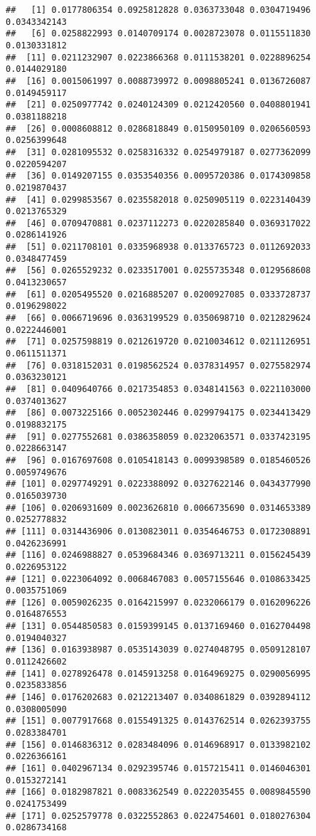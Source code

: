 \documentclass[
]{article}
\begin{document}
\begin{verbatim}
##   [1] 0.0177806354 0.0925812828 0.0363733048 0.0304719496 0.0343342143
##   [6] 0.0258822993 0.0140709174 0.0028723078 0.0115511830 0.0130331812
##  [11] 0.0211232907 0.0223866368 0.0111538201 0.0228896254 0.0144029180
##  [16] 0.0015061997 0.0088739972 0.0098805241 0.0136726087 0.0149459117
##  [21] 0.0250977742 0.0240124309 0.0212420560 0.0408801941 0.0381188218
##  [26] 0.0008608812 0.0286818849 0.0150950109 0.0206560593 0.0256399648
##  [31] 0.0281095532 0.0258316332 0.0254979187 0.0277362099 0.0220594207
##  [36] 0.0149207155 0.0353540356 0.0095720386 0.0174309858 0.0219870437
##  [41] 0.0299853567 0.0235582018 0.0250905119 0.0223140439 0.0213765329
##  [46] 0.0709470881 0.0237112273 0.0220285840 0.0369317022 0.0286141926
##  [51] 0.0211708101 0.0335968938 0.0133765723 0.0112692033 0.0348477459
##  [56] 0.0265529232 0.0233517001 0.0255735348 0.0129568608 0.0413230657
##  [61] 0.0205495520 0.0216885207 0.0200927085 0.0333728737 0.0196298022
##  [66] 0.0066719696 0.0363199529 0.0350698710 0.0212829624 0.0222446001
##  [71] 0.0257598819 0.0212619720 0.0210034612 0.0211126951 0.0611511371
##  [76] 0.0318152031 0.0198562524 0.0378314957 0.0275582974 0.0363230121
##  [81] 0.0409640766 0.0217354853 0.0348141563 0.0221103000 0.0374013627
##  [86] 0.0073225166 0.0052302446 0.0299794175 0.0234413429 0.0198832175
##  [91] 0.0277552681 0.0386358059 0.0232063571 0.0337423195 0.0228663147
##  [96] 0.0167697608 0.0105418143 0.0099398589 0.0185460526 0.0059749676
## [101] 0.0297749291 0.0223388092 0.0327622146 0.0434377990 0.0165039730
## [106] 0.0206931609 0.0023626810 0.0066735690 0.0314653389 0.0252778832
## [111] 0.0314436906 0.0130823011 0.0354646753 0.0172308891 0.0426236991
## [116] 0.0246988827 0.0539684346 0.0369713211 0.0156245439 0.0226953122
## [121] 0.0223064092 0.0068467083 0.0057155646 0.0108633425 0.0035751069
## [126] 0.0059026235 0.0164215997 0.0232066179 0.0162096226 0.0164876553
## [131] 0.0544850583 0.0159399145 0.0137169460 0.0162704498 0.0194040327
## [136] 0.0163938987 0.0535143039 0.0274048795 0.0509128107 0.0112426602
## [141] 0.0278926478 0.0145913258 0.0164969275 0.0290056995 0.0235833856
## [146] 0.0176202683 0.0212213407 0.0340861829 0.0392894112 0.0308005090
## [151] 0.0077917668 0.0155491325 0.0143762514 0.0262393755 0.0283384701
## [156] 0.0146836312 0.0283484096 0.0146968917 0.0133982102 0.0226366161
## [161] 0.0402967134 0.0292395746 0.0157215411 0.0146046301 0.0153272141
## [166] 0.0182987821 0.0083362549 0.0222035455 0.0089845590 0.0241753499
## [171] 0.0252579778 0.0322552863 0.0224754601 0.0180276304 0.0286734168

\end{verbatim}
\end{document}
